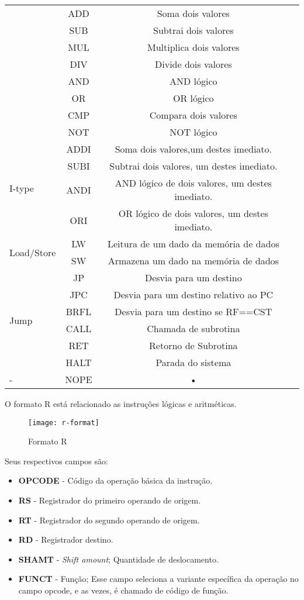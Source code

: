 \begin{center}
\begin{longtable}[pos]{| l | c | c | m{7cm} |}
          \hline
          \endlastfoot    
			\multirow{8}{*}{R-type} & ADD & Soma dois valores \\ \cline{2-3}	
	& SUB & Subtrai dois valores \\ \cline{2-3}	
	& MUL & Multiplica dois valores \\ \cline{2-3}	
	& DIV & Divide dois valores \\ \cline{2-3}
	& AND & AND lógico \\ \cline{2-3}
	& OR & OR lógico  \\ \cline{2-3}
	& CMP & Compara dois valores \\ \cline{2-3}
	& NOT & NOT lógico \\ \hline 
	\multirow{4}{*}{I-type} & ADDI & Soma dois valores,um destes imediato. \\ \cline{2-3}
	& SUBI & Subtrai dois valores, um destes imediato. \\ \cline{2-3}
	& ANDI & AND lógico de dois valores, um destes imediato. \\ \cline{2-3}
	& ORI & OR lógico de dois valores, um destes imediato. \\ \hline
	\multirow{2}{*}{Load/Store} & LW & Leitura de um dado da memória de dados \\ \cline{2-3}
	& SW & Armazena um dado na memória de dados \\ \hline
	\multirow{6}{*}{Jump} & JP & Desvia para um destino \\ \cline{2-3}
	& JPC & Desvia para um destino relativo ao PC \\ \cline{2-3}
	& BRFL & Desvia para um destino se RF==CST \\ \cline{2-3}
	& CALL & Chamada de subrotina \\ \cline{2-3}
	& RET & Retorno de Subrotina \\ \cline{2-3}
	& HALT & Parada do sistema \\ \hline
	- & NOPE & • \\ \hline
\end{longtable}
\end{center}

	O formato R está relacionado as instruções lógicas e aritméticas.
	\begin{figure}[H]
    	\centering
    	\texttt{[image: r-format]}
    	\caption{Formato R}
		\label{r_format}
	\end{figure}
	Seus respectivos campos são:
	\begin{itemize}
	\item \textbf{OPCODE} - Código da operação básica da instrução.
	\item \textbf{RS} - Registrador do primeiro operando de origem.
	\item \textbf{RT} - Registrador do segundo operando de origem.
	\item \textbf{RD} - Registrador destino.
	\item \textbf{SHAMT} - \textit{Shift amount}; Quantidade de deslocamento.
	\item \textbf{FUNCT} - Função; Esse campo seleciona a variante específica da operação no campo opcode, e as vezes, é chamado de código de função.
\end{itemize}	
  	
